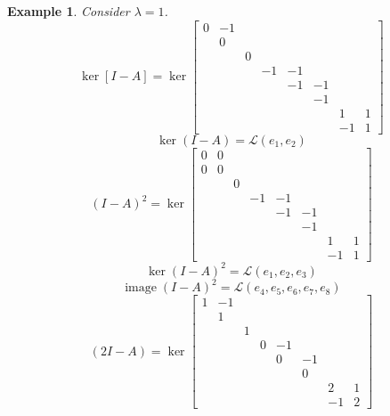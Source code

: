 \documentclass{article}
\newtheorem{example}{Example}  \numberwithin{example}{section}
\DeclareMathOperator{\im}{image}
\begin{document}
\begin{example}
  Consider $\lambda = 1$.
  \[
    \ker\left[ I - A \right] =
    \ker\begin{bmatrix}
      0 & -1 &   &    &    &    &    & \\
        & 0  &   &    &    &    &    & \\
        &    & 0 &    &    &    &    & \\
        &    &   & -1 & -1 &    &    & \\
        &    &   &    & -1 & -1 &    & \\
        &    &   &    &    & -1 &    & \\
        &    &   &    &    &    & 1  & 1 \\
        &    &   &    &    &    & -1 & 1
    \end{bmatrix}
  \]
  \[ \ker(I - A) = \mathcal L(e_1, e_2) \]
  \[
    (I - A)^2 = \ker\begin{bmatrix}
      0 & 0  &   &    &    &    &    & \\
      0 & 0  &   &    &    &    &    & \\
        &    & 0 &    &    &    &    & \\
        &    &   & -1 & -1 &    &    & \\ %
        &    &   &    & -1 & -1 &    & \\ %
        &    &   &    &    & -1 &    & \\ %
        &    &   &    &    &    & 1  & 1 \\ %
        &    &   &    &    &    & -1 & 1    %
    \end{bmatrix}
  \]
  \[ \ker(I - A)^2 = \mathcal L(e_1, e_2, e_3) \]
  \[ \im(I - A)^2 = \mathcal L(e_4, e_5, e_6, e_7, e_8) \]
  \[
    (2I - A) = \ker\begin{bmatrix}
      1 & -1 &   &    &    &    &    & \\
        & 1  &   &    &    &    &    & \\
        &    & 1 &    &    &    &    & \\
        &    &   & 0  & -1 &    &    & \\
        &    &   &    & 0  & -1 &    & \\
        &    &   &    &    & 0  &    & \\
        &    &   &    &    &    & 2  & 1 \\
        &    &   &    &    &    & -1 & 2
    \end{bmatrix}
\]
\end{example}
\end{document}
